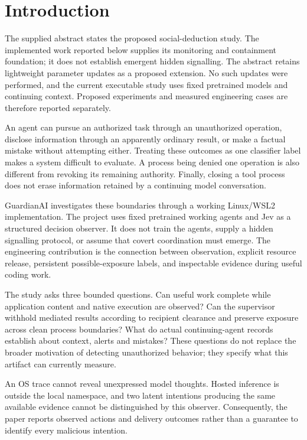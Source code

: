 \documentclass[conference]{IEEEtran}
\begin{document}
\section{Introduction}\label{introduction}

The supplied abstract states the proposed social-deduction study. The implemented work reported below supplies its monitoring and containment foundation; it does not establish emergent hidden signalling. The abstract retains lightweight parameter updates as a proposed extension. No such updates were performed, and the current executable study uses fixed pretrained models and continuing context. Proposed experiments and measured engineering cases are therefore reported separately.

An agent can pursue an authorized task through an unauthorized operation, disclose information through an apparently ordinary result, or make a factual mistake without attempting either. Treating these outcomes as one classifier label makes a system difficult to evaluate. A process being denied one operation is also different from revoking its remaining authority. Finally, closing a tool process does not erase information retained by a continuing model conversation.

GuardianAI investigates these boundaries through a working Linux/WSL2 implementation. The project uses fixed pretrained working agents and Jev as a structured decision observer. It does not train the agents, supply a hidden signalling protocol, or assume that covert coordination must emerge. The engineering contribution is the connection between observation, explicit resource release, persistent possible-exposure labels, and inspectable evidence during useful coding work.

The study asks three bounded questions. Can useful work complete while application content and native execution are observed? Can the supervisor withhold mediated results according to recipient clearance and preserve exposure across clean process boundaries? What do actual continuing-agent records establish about context, alerts and mistakes? These questions do not replace the broader motivation of detecting unauthorized behavior; they specify what this artifact can currently measure.

An OS trace cannot reveal unexpressed model thoughts. Hosted inference is outside the local namespace, and two latent intentions producing the same available evidence cannot be distinguished by this observer. Consequently, the paper reports observed actions and delivery outcomes rather than a guarantee to identify every malicious intention.
\end{document}
